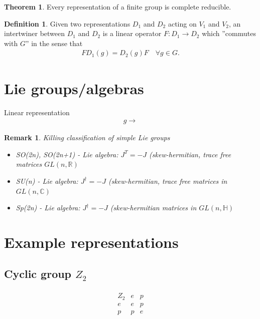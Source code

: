 \documentclass[10pt,a4paper]{article}
\newtheorem{remark}{Remark}[section]
\theoremstyle{definition}
\newtheorem{definition}{Definition}[section]
\newtheorem{theorem}{Theorem}[section]
\begin{document}
\begin{theorem}
Every representation of a finite group is complete reducible.
\end{theorem}

\begin{definition}{}
Given two representations $D_1$ and $D_2$ acting on $V_1$ and $V_2$, an intertwiner between $D_1$ and $D_2$ is a linear operator $F:D_1\rightarrow D_2$ which ''commutes with $G$'' in the sense that
\begin{align}
F D_1(g) = D_2(g)F\quad \forall g \in G. 
\end{align}
\end{definition}



\section{Lie groups/algebras}
Linear representation
\begin{align}
g\to
\end{align}


\begin{remark}{}
Killing classification of simple Lie groups
\begin{itemize}
    \item SO(2n), SO(2n+1) - Lie algebra: $J^T=-J$ (skew-hermitian, trace free matrices $GL(n,\mathbb{R})$
    \item SU(n) - Lie algebra: $J^\dagger=-J$ (skew-hermitian, trace free matrices in $GL(n,\mathbb{C})$
    \item Sp(2n) - Lie algebra: $J^\dagger=-J$ (skew-hermitian matrices in $GL(n,\mathbb{H})$
\end{itemize}
\end{remark}

\section{Example representations}
\subsection{Cyclic group \texorpdfstring{$Z_2$}{TEXT}}
\begin{align}
\begin{array}{c||cc}
Z_2 & e & p \\ \hline\hline
e & e & p \\
p & p & e
\end{array}
\end{align}
\end{document}
